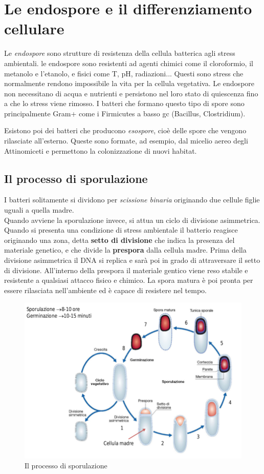 \documentclass[11pt]{book}
\begin{document}
\clearpage
\chapter{Le endospore e il differenziamento cellulare}
Le \emph{endospore} sono strutture di resistenza della cellula batterica agli stress ambientali. le endospore sono resistenti ad agenti chimici come il cloroformio, il metanolo e l'etanolo, e fisici come T, pH, radiazioni...
Questi sono stress che normalmente rendono impossibile la vita per la cellula vegetativa. Le endospore non necessitano di acqua e nutrienti e persistono nel loro stato di quiescenza fino a che lo stress viene rimosso. I batteri che formano questo tipo di spore sono principalmente Gram+ come i Firmicutes a basso gc (Bacillus, Clostridium).

Esistono poi dei batteri che producono \emph{esospore}, cioè delle spore che vengono rilasciate all'esterno. Queste sono formate, ad esempio, dal micelio aereo degli Attinomiceti e permettono la colonizzazione di nuovi habitat.



\section{Il processo di sporulazione}
I batteri solitamente si dividono per \emph{scissione binaria} originando due cellule figlie uguali a quella madre.\\
Quando avviene la sporulazione invece, si attua un ciclo di divisione asimmetrica.
Quando si presenta una condizione di stress ambientale il batterio reagisce originando una zona, detta \textbf{setto di divisione} che indica la presenza del materiale genetico, e che divide la \textbf{prespora} dalla cellula madre. Prima della divisione asimmetrica il DNA si replica e sarà poi in grado di attraversare il setto di divisione.
All'interno della prespora il materiale gentico viene reso stabile e resistente a qualsiasi attacco fisico e chimico. La spora matura è poi pronta per essere rilasciata nell'ambiente ed è capace di resistere nel tempo.

\clearpage

\begin{figure}[htp]
\centering
\includegraphics[scale=0.4]{img/Sporulazione.png}
\caption{Il processo di sporulazione}
\label{}
\end{figure}
\end{document}
